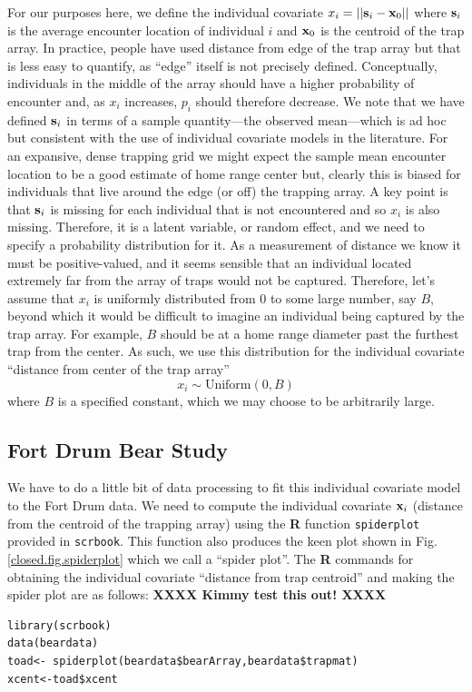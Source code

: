 For our purposes here, we define the individual covariate $x_{i} = ||{\bf s}_{i} - {\bf
  x}_{0}||$ where ${\bf s}_{i}$ is the average encounter location of
individual $i$ and ${\bf x}_{0}$ is the centroid of the trap array.
In practice, people have
used distance from edge of the trap array but that is less easy to
quantify, as ``edge'' itself is not precisely defined.
Conceptually, individuals in the middle of the array should have a
higher probability of encounter and, as $x_{i}$ increases, $p_{i}$
should therefore decrease. We note that we have defined ${\bf s}_{i}$
in terms of a sample quantity---the observed mean---which is ad hoc
but consistent with the use of individual covariate models
 in the literature.  For an
expansive, dense trapping grid we might expect the sample mean
encounter location to be a good estimate of home range center but,
clearly this is biased for individuals that live around the edge (or
off) the trapping array. 
 A key point is that
${\bf s}_{i}$ is missing for each individual that is not encountered
and so  $x_{i}$ is also missing. Therefore, it is a latent variable, or random
effect, and we need  to specify a probability distribution
for it.  As a measurement of distance we know it must be
positive-valued, and it seems sensible that an individual located
extremely far from the array of traps would not be captured.
Therefore, let's assume that $x_{i}$ is uniformly distributed from $0$ to some large number,
say $B$, beyond which it would be difficult to imagine an
individual being captured by the trap array. For example, $B$ should be at a home
range diameter past the furthest trap from the center.  As such, we
use this distribution for the individual covariate ``distance from
center of the trap array''
\[
 x_{i} \sim \mbox{Uniform}(0,B)
\]
where $B$ is a specified constant, which we may choose to be
arbitrarily large.  


\subsection{Fort Drum Bear Study}


We have to do a little bit of data processing to fit this individual
covariate model to the Fort Drum data.  We need to compute the
individual covariate ${\bf x}_{i}$ (distance from the centroid of the
trapping array) using the {\bf R} function \mbox{\tt spiderplot}
provided in \mbox{\tt scrbook}. This function also produces the keen
plot shown in Fig. \ref{closed.fig.spiderplot} which we call a
``spider plot''.  The {\bf R} commands for obtaining the individual
covariate ``distance from trap centroid'' and making the spider plot
are as follows: {\bf XXXX Kimmy test this out! XXXX}
\begin{verbatim}
library(scrbook)
data(beardata)
toad<- spiderplot(beardata$bearArray,beardata$trapmat)
xcent<-toad$xcent
\end{verbatim}

